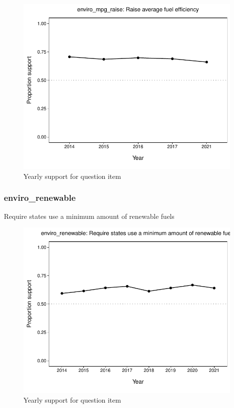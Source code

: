 \documentclass[
  12pt]{article}
\begin{document}
\begin{figure}

{\centering \includegraphics{error-checking_files/figure-latex/unnamed-chunk-3-10} 

}

\caption{Yearly support for question item}\label{fig:unnamed-chunk-3-10}
\end{figure}

\hypertarget{enviro_renewable}{%
\subsubsection{enviro\_renewable}\label{enviro_renewable}}

Require states use a minimum amount of renewable fuels

\begin{figure}

{\centering \includegraphics{error-checking_files/figure-latex/unnamed-chunk-3-11} 

}

\caption{Yearly support for question item}\label{fig:unnamed-chunk-3-11}
\end{figure}
\end{document}
